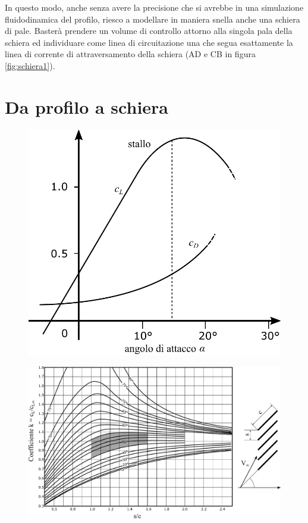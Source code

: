 In questo modo, anche senza avere la precisione che si avrebbe in una simulazione fluidodinamica del profilo, riesco a modellare in maniera snella anche una schiera di pale. Basterà prendere un volume di controllo attorno alla singola pala della schiera ed individuare come linea di circuitazione una che segua esattamente la linea di corrente di attraversamento della schiera (AD e CB in figura \ref{fig:schiera1}).


\section{Da profilo a schiera} 
\begin{figure}
\centering
\begin{minipage}{.3\textwidth}
  \centering
  \includegraphics[width=.95\linewidth]{fig/cdcl.pdf}
  \label{fig:cdcl}
\end{minipage}%
\begin{minipage}{.7\textwidth}
  \centering
  \includegraphics[width=.95\linewidth]{fig/EffSchiera.pdf}
  \label{fig:EffSchiera}
\end{minipage}
\end{figure}

